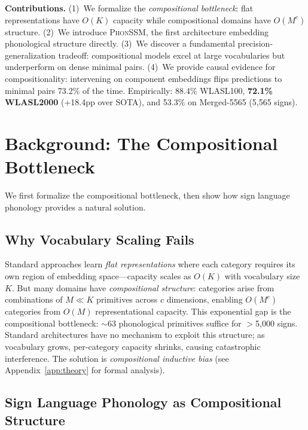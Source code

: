 \documentclass{article}
\theoremstyle{definition}
\theoremstyle{remark}
\newcommand{\phonssm}{\textsc{PhonSSM}}
\begin{document}
\textbf{Contributions.} (1)~We formalize the \textit{compositional bottleneck}: flat representations have $O(K)$ capacity while compositional domains have $O(M^c)$ structure. (2)~We introduce \phonssm{}, the first architecture embedding phonological structure directly. (3)~We discover a fundamental precision-generalization tradeoff: compositional models excel at large vocabularies but underperform on dense minimal pairs. (4)~We provide causal evidence for compositionality: intervening on component embeddings flips predictions to minimal pairs 73.2\% of the time. Empirically: 88.4\% WLASL100, \textbf{72.1\% WLASL2000} (+18.4pp over SOTA), and 53.3\% on Merged-5565 (5,565 signs).

\section{Background: The Compositional Bottleneck}
\label{sec:background}

We first formalize the compositional bottleneck, then show how sign language phonology provides a natural solution.

\subsection{Why Vocabulary Scaling Fails}

Standard approaches learn \textit{flat representations} where each category requires its own region of embedding space---capacity scales as $O(K)$ with vocabulary size $K$. But many domains have \textit{compositional structure}: categories arise from combinations of $M \ll K$ primitives across $c$ dimensions, enabling $O(M^c)$ categories from $O(M)$ representational capacity. This exponential gap is the compositional bottleneck: $\sim$63 phonological primitives suffice for $>$5,000 signs. Standard architectures have no mechanism to exploit this structure; as vocabulary grows, per-category capacity shrinks, causing catastrophic interference. The solution is \textit{compositional inductive bias} (see Appendix~\ref{app:theory} for formal analysis).

\subsection{Sign Language Phonology as Compositional Structure}
\end{document}
